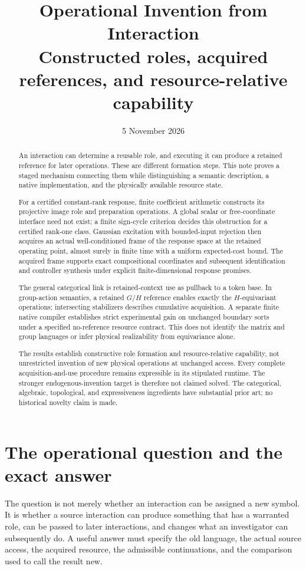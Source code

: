 \documentclass[11pt]{article}
\title{Operational Invention from Interaction\\
\large Constructed roles, acquired references, and resource-relative capability}
\author{}\date{5 November 2026}
\theoremstyle{definition}
\theoremstyle{remark}
\begin{document}
\maketitle
\begin{abstract}
An interaction can determine a reusable role, and executing it can produce a retained reference for later operations. These are different formation steps. This note proves a staged mechanism connecting them while distinguishing a semantic description, a native implementation, and the physically available resource state.

For a certified constant-rank response, finite coefficient arithmetic constructs its projective image role and preparation operations. A global scalar or free-coordinate interface need not exist; a finite sign-cycle criterion decides this obstruction for a certified rank-one class. Gaussian excitation with bounded-input rejection then acquires an actual well-conditioned frame of the response space at the retained operating point, almost surely in finite time with a uniform expected-cost bound. The acquired frame supports exact compositional coordinates and subsequent identification and controller synthesis under explicit finite-dimensional response promises.

The general categorical link is retained-context use as pullback to a token base. In group-action semantics, a retained $G/H$ reference enables exactly the $H$-equivariant operations; intersecting stabilizers describes cumulative acquisition. A separate finite native compiler establishes strict experimental gain on unchanged boundary sorts under a specified no-reference resource contract. This does not identify the matrix and group languages or infer physical realizability from equivariance alone.

The results establish constructive role formation and resource-relative capability, not unrestricted invention of new physical operations at unchanged access. Every complete acquisition-and-use procedure remains expressible in its stipulated runtime. The stronger endogenous-invention target is therefore not claimed solved. The categorical, algebraic, topological, and expressiveness ingredients have substantial prior art; no historical novelty claim is made.
\end{abstract}
\tableofcontents

\section{The operational question and the exact answer}
The question is not merely whether an interaction can be assigned a new symbol. It is whether a source interaction can produce something that has a warranted role, can be passed to later interactions, and changes what an investigator can subsequently do. A useful answer must specify the old language, the actual source access, the acquired resource, the admissible continuations, and the comparison used to call the result new.
\end{document}
